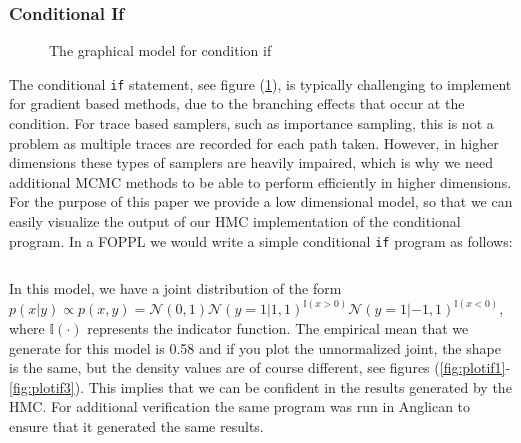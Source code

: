 \documentclass[twoside]{article}
\begin{document}
\subsubsection{Conditional If}
\begin{figure}[ht]
	\begin{center}
		
	\end{center}
	\caption{The graphical model for condition if}
	\label{fig:conif}
\end{figure}
The conditional \texttt{if} statement, see figure (\ref{fig:conif}), is typically challenging to implement for gradient based methods, due to the branching effects that occur at the condition. For trace based samplers, such as importance sampling, this is not a problem as multiple traces are recorded for each path taken. However, in higher dimensions these types of samplers are heavily impaired, which is why we need additional MCMC methods to be able to perform efficiently in higher dimensions. For the purpose of this paper we provide a low dimensional model, so that we can easily visualize the output of our HMC implementation of the conditional program. In a FOPPL we would write a simple conditional \texttt{if} program as follows:\inputminted{clojure}{code/conditionalif.clj}
 In this model, we have a joint distribution of the form $p(x | y) \propto p(x, y) = \mathcal{N}(0,1)\mathcal{N}(y = 1|1,1)^{\mathbb{I}(x > 0)}\mathcal{N}(y = 1|-1,1)^{\mathbb{I}(x < 0)}$, where $\mathbb{I}(\cdot)$ represents the indicator function. The empirical mean that we generate for this model is 0.58 and if you plot the unnormalized joint, the shape is the same, but the density values are of course different, see figures (\ref{fig:plotif1}-\ref{fig:plotif3}). This implies that we can be confident in the results generated by the HMC. For additional verification the same program was run in Anglican \cite{wood2014new} to ensure that it generated the same results. 
\end{document}
